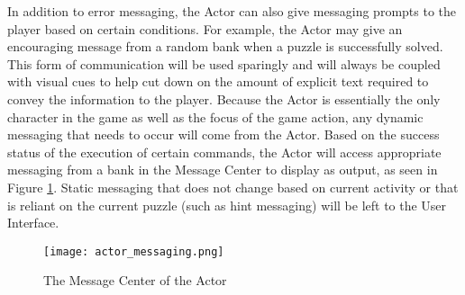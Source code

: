 In addition to error messaging, the Actor can also give messaging prompts to the player based 
on certain conditions. For example, the Actor may give an encouraging message from a random 
bank when a puzzle is successfully solved. This form of communication will be used sparingly 
and will always be coupled with visual cues to help cut down on the amount of explicit text 
required to convey the information to the player. Because the Actor is essentially the only 
character in the game as well as the focus of the game action, any dynamic messaging that 
needs to occur will come from the Actor. Based on the success status of the execution of certain 
commands, the Actor will access appropriate messaging from a bank in the Message Center to 
display as output, as seen in Figure \ref{fig:actor_messaging}. Static messaging that does not 
change based on current activity or that is reliant on the current puzzle (such as hint messaging) 
will be left to the User Interface.\\

\begin{figure}[h]
  \caption{The Message Center of the Actor}
  \label{fig:actor_messaging}
  \centering
  \texttt{[image: actor\_messaging.png]}
\end{figure}
\vfill
\clearpage